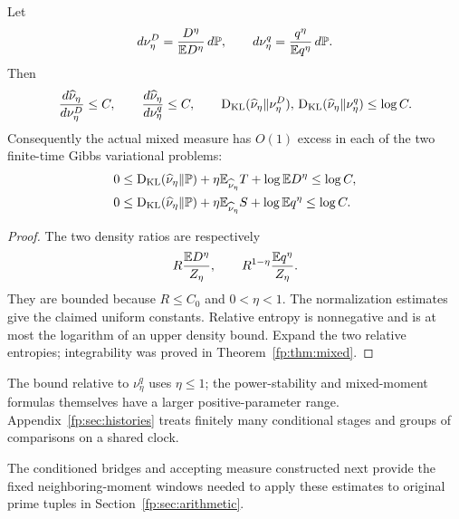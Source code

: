\begin{proposition}\label{fp:prop:gibbs}
Let
\[
 d\nu_\eta^D=\frac{D^\eta}{\mathbb E D^\eta}\,d\mathbb P,
 \qquad
 d\nu_\eta^q=\frac{q^\eta}{\mathbb E q^\eta}\,d\mathbb P.
\]
Then
\begin{equation}\label{fp:eq:gibbs-density}
 \frac{d\widehat\nu_\eta}{d\nu_\eta^D}\le C,
 \qquad \frac{d\widehat\nu_\eta}{d\nu_\eta^q}\le C,
 \qquad
 \operatorname{D_{\mathrm{KL}}}(\widehat\nu_\eta\Vert\nu_\eta^D),\,
 \operatorname{D_{\mathrm{KL}}}(\widehat\nu_\eta\Vert\nu_\eta^q)\le\log C.
\end{equation}
Consequently the actual mixed measure has $O(1)$ excess in each of the two finite-time Gibbs variational problems:
\begin{align}
 0&\le\operatorname{D_{\mathrm{KL}}}(\widehat\nu_\eta\Vert\mathbb P)+\eta\mathbb E_{\widehat\nu_\eta}T+\log\mathbb E D^\eta\le\log C,\label{fp:eq:gibbs-D}\\
 0&\le\operatorname{D_{\mathrm{KL}}}(\widehat\nu_\eta\Vert\mathbb P)+\eta\mathbb E_{\widehat\nu_\eta}S+\log\mathbb E q^\eta\le\log C.\label{fp:eq:gibbs-q}
\end{align}
\end{proposition}
\begin{proof}
The two density ratios are respectively
\[
 R\frac{\mathbb E D^\eta}{Z_\eta},\qquad
 R^{1-\eta}\frac{\mathbb E q^\eta}{Z_\eta}.
\]
They are bounded because $R\le C_0$ and $0<\eta<1$. The normalization estimates give the claimed uniform constants. Relative entropy is nonnegative and is at most the logarithm of an upper density bound. Expand the two relative entropies; integrability was proved in Theorem~\ref{fp:thm:mixed}.
\end{proof}

\begin{remark}\label{fp:rem:forward-kl}
The bound relative to $\nu_\eta^q$ uses $\eta\le1$; the power-stability and mixed-moment formulas themselves have a larger positive-parameter range. Appendix~\ref{fp:sec:histories} treats finitely many conditional stages and groups of comparisons on a shared clock.
\end{remark}

The conditioned bridges and accepting measure constructed next provide
the fixed neighboring-moment windows needed to apply these estimates
to original prime tuples in Section~\ref{fp:sec:arithmetic}.
